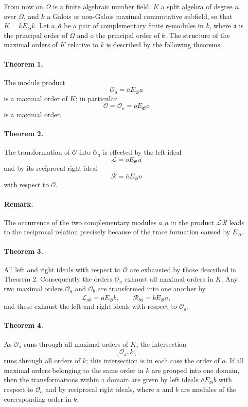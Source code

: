 \documentclass[11pt]{article}
\providecommand{\Gg}{\mathfrak G}
\providecommand{\oo}{\mathfrak o}
\begin{document}
From now on \(\Omega\) is a finite algebraic number field, \(K\) a split algebra of degree \(n\) over \(\Omega\), and \(k\) a Galois or non-Galois maximal commutative subfield, so that \(K=kE_\Gg k\). Let \(a,\bar a\) be a pair of complementary finite \(\oo\)-modules in \(k\), where \(\oo\) is the principal order of \(\Omega\) and \(o\) the principal order of \(k\). The structure of the maximal orders of \(K\) relative to \(k\) is described by the following theorems.

\paragraph{Theorem 1.}
The module product
\[
        \mathcal O_a=\bar a E_\Gg a
\]
is a maximal order of \(K\); in particular
\[
        \mathcal O=\mathcal O_o=oE_\Gg o
\]
is a maximal order.

\paragraph{Theorem 2.}
The transformation of \(\mathcal O\) into \(\mathcal O_a\) is effected by the left ideal
\[
        \mathcal L=oE_\Gg a
\]
and by its reciprocal right ideal
\[
        \mathcal R=\bar a E_\Gg o
\]
with respect to \(\mathcal O\).

\paragraph{Remark.}
The occurrence of the two complementary modules \(a,\bar a\) in the product \(\mathcal L\mathcal R\) leads to the reciprocal relation precisely because of the trace formation caused by \(E_\Gg\).

\paragraph{Theorem 3.}
All left and right ideals with respect to \(\mathcal O\) are exhausted by those described in Theorem 2. Consequently the orders \(\mathcal O_a\) exhaust all maximal orders in \(K\). Any two maximal orders \(\mathcal O_a\) and \(\mathcal O_b\) are transformed into one another by
\[
        \mathcal L_{ab}=\bar aE_\Gg b,
        \qquad
        \mathcal R_{ba}=\bar bE_\Gg a,
\]
and these exhaust the left and right ideals with respect to \(\mathcal O_a\).

\paragraph{Theorem 4.}
As \(\mathcal O_a\) runs through all maximal orders of \(K\), the intersection
\[
        [\mathcal O_a,k]
\]
runs through all orders of \(k\); this intersection is in each case the order of \(a\). If all maximal orders belonging to the same order in \(k\) are grouped into one domain, then the transformations within a domain are given by left ideals \(\bar aE_\Gg b\) with respect to \(\mathcal O_a\) and by reciprocal right ideals, where \(a\) and \(b\) are modules of the corresponding order in \(k\).
\end{document}
